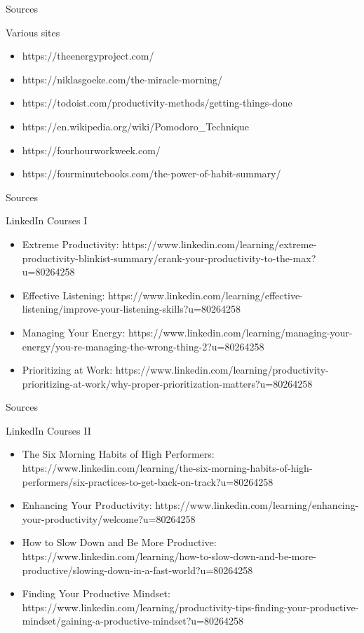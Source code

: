 \begin{frame}{Sources}
  \begin{block}{Various sites}
    \begin{itemize}
      \item https://theenergyproject.com/
      \item https://niklasgoeke.com/the-miracle-morning/
      \item https://todoist.com/productivity-methods/getting-things-done
      \item https://en.wikipedia.org/wiki/Pomodoro\_Technique
      \item https://fourhourworkweek.com/
      \item https://fourminutebooks.com/the-power-of-habit-summary/
    \end{itemize}
  \end{block}
\end{frame}

\begin{frame}{Sources}
  \begin{block}{LinkedIn Courses I}
    \begin{itemize}
      \item Extreme Productivity: https://www.linkedin.com/learning/extreme-productivity-blinkist-summary/crank-your-productivity-to-the-max?u=80264258
      \item Effective Listening: https://www.linkedin.com/learning/effective-listening/improve-your-listening-skills?u=80264258
      \item Managing Your Energy: https://www.linkedin.com/learning/managing-your-energy/you-re-managing-the-wrong-thing-2?u=80264258
      \item Prioritizing at Work: https://www.linkedin.com/learning/productivity-prioritizing-at-work/why-proper-prioritization-matters?u=80264258
    \end{itemize}
  \end{block}
\end{frame}

\begin{frame}{Sources}
  \begin{block}{LinkedIn Courses II}
    \begin{itemize}
      \item The Six Morning Habits of High Performers: https://www.linkedin.com/learning/the-six-morning-habits-of-high-performers/six-practices-to-get-back-on-track?u=80264258
      \item Enhancing Your Productivity: https://www.linkedin.com/learning/enhancing-your-productivity/welcome?u=80264258
      \item How to Slow Down and Be More Productive: https://www.linkedin.com/learning/how-to-slow-down-and-be-more-productive/slowing-down-in-a-fast-world?u=80264258
      \item Finding Your Productive Mindset: https://www.linkedin.com/learning/productivity-tips-finding-your-productive-mindset/gaining-a-productive-mindset?u=80264258
    \end{itemize}
  \end{block}
\end{frame}

